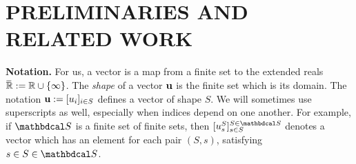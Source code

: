 \documentclass[twoside]{article}
\begin{document}
\section{PRELIMINARIES AND RELATED WORK}

\textbf{Notation.}
For us, a vector is a map from a finite set to the extended reals
    $\mskip1mu\overline{\mskip-1mu\mathbb R\!}\, := \mathbb R \cup \{\infty\}$.
The \emph{shape} of a vector $\mathbf{u}$ is the finite set which is its domain.
The notation $\mathbf{u} := [u_i]_{i \in S}$ defines a vector of shape $S$.
We will sometimes use superscripts as well, especially when indices depend on one another. For example, if $\dg S$ is a finite set of finite sets, then
$[u^S_s]^{S \in \dg S}_{s \in S}$ denotes a vector which has an element
for each pair $(S,s)$, satisfying $s \in S \in \dg S$.
\end{document}
